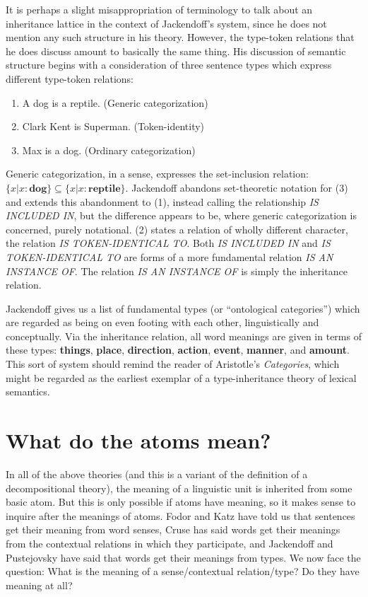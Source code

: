 \documentclass[12pt]{amsart}
\begin{document}
It is perhaps a slight misappropriation of terminology to talk about an inheritance lattice in the context of Jackendoff's system, since he does not mention any such structure in his theory. However, the type-token relations that he does discuss amount to basically the same thing. His discussion of semantic structure begins with a consideration of three sentence types which express different type-token relations:
\begin{enumerate}
\item A dog is a reptile. (Generic categorization)
\item Clark Kent is Superman. (Token-identity)
\item Max is a dog. (Ordinary categorization)
\end{enumerate}
Generic categorization, in a sense, expresses the set-inclusion relation: $\{x\vert x:\textbf{dog}\}\subseteq\{x\vert x:\textbf{reptile}\}$. Jackendoff abandons set-theoretic notation for (3) and extends this abandonment to (1), instead calling the relationship \emph{IS INCLUDED IN}, but the difference appears to be, where generic categorization is concerned, purely notational. (2) states a relation of wholly different character, the relation \emph{IS TOKEN-IDENTICAL TO}. Both \emph{IS INCLUDED IN} and \emph{IS TOKEN-IDENTICAL TO} are forms of a more fundamental relation \emph{IS AN INSTANCE OF}. The relation \emph{IS AN INSTANCE OF} is simply the inheritance relation.

Jackendoff gives us a list of fundamental types (or ``ontological categories'') which are regarded as being on even footing with each other, linguistically and conceptually. Via the inheritance relation, all word meanings are given in terms of these types: {\bf things}, {\bf place}, {\bf direction}, {\bf action}, {\bf event}, {\bf manner}, and {\bf amount}. This sort of system should remind the reader of Aristotle's \emph{Categories}, which might be regarded as the earliest exemplar of a type-inheritance theory of lexical semantics.

\section{What do the atoms mean?}

In all of the above theories (and this is a variant of the definition of a decompositional theory), the meaning of a linguistic unit is inherited from some basic atom. But this is only possible if atoms have meaning, so it makes sense to inquire after the meanings of atoms. Fodor and Katz \cite{fodor_structure_1963} have told us that sentences get their meaning from word senses, Cruse \cite{cruse_lexical_1986} has said words get their meanings from the contextual relations in which they participate, and Jackendoff \cite{jackendoff_semantics_1983} and Pustejovsky \cite{pustejovsky_generative_1998} have said that words get their meanings from types. We now face the question: What is the meaning of a sense/contextual relation/type? Do they have meaning at all?
\end{document}
